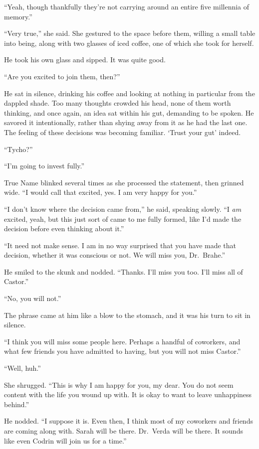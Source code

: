 ``Yeah, though thankfully they're not carrying around an entire five millennia of memory.''

``Very true,'' she said. She gestured to the space before them, willing a small table into being, along with two glasses of iced coffee, one of which she took for herself.

He took his own glass and sipped. It was quite good.

``Are you excited to join them, then?''

He sat in silence, drinking his coffee and looking at nothing in particular from the dappled shade. Too many thoughts crowded his head, none of them worth thinking, and once again, an idea sat within his gut, demanding to be spoken. He savored it intentionally, rather than shying away from it as he had the last one. The feeling of these decisions was becoming familiar. `Trust your gut' indeed.

``Tycho?''

``I'm going to invest fully.''

True Name blinked several times as she processed the statement, then grinned wide. ``I would call that excited, yes. I am very happy for you.''

``I don't know where the decision came from,'' he said, speaking slowly. ``I \emph{am} excited, yeah, but this just sort of came to me fully formed, like I'd made the decision before even thinking about it.''

``It need not make sense. I am in no way surprised that you have made that decision, whether it was conscious or not. We will miss you, Dr.~Brahe.''

He smiled to the skunk and nodded. ``Thanks. I'll miss you too. I'll miss all of Castor.''

``No, you will not.''

The phrase came at him like a blow to the stomach, and it was his turn to sit in silence.

``I think you will miss some people here. Perhaps a handful of coworkers, and what few friends you have admitted to having, but you will not miss Castor.''

``Well, huh.''

She shrugged. ``This is why I am happy for you, my dear. You do not seem content with the life you wound up with. It is okay to want to leave unhappiness behind.''

He nodded. ``I suppose it is. Even then, I think most of my coworkers and friends are coming along with. Sarah will be there. Dr.~Verda will be there. It sounds like even Codrin will join us for a time.''

